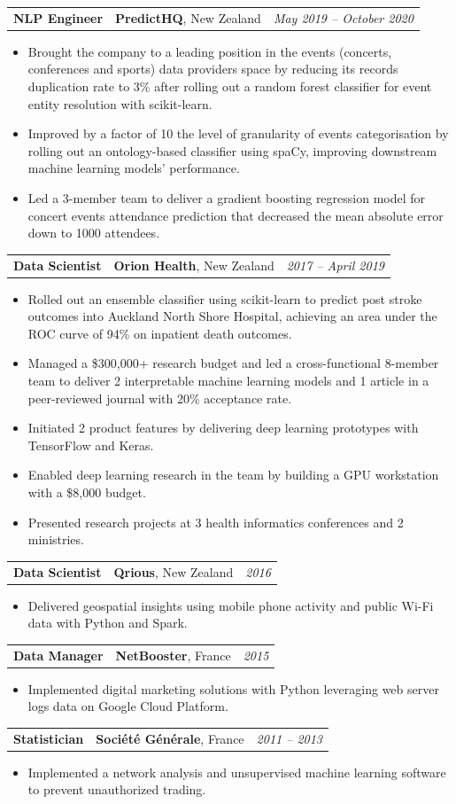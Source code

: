 \documentclass[letterpaper,11pt]{article}
\newcommand{\resumeItemListStart}{\begin{itemize}[label=$\circ$, topsep=0.1cm, parsep=0cm, partopsep=0cm, itemsep=0.1cm, leftmargin=0.4cm]}
\newcommand{\resumeItem}[1]{\item\small{#1}}
\newcommand{\resumeJustifiedItem}[1]{\item\begin{justify}\small{#1}\end{justify}}
\newcommand{\resumeItemListEnd}{\end{itemize}}
\newcommand{\job}[4]{
    \begin{tabular}{p{7cm}p{6cm}p{5cm}}
      \hspace{-0.7em} \textbf{#1} & \textbf{\small{#2}}\scriptsize{, #3} & \hfill \textit{\small{#4}}
    \end{tabular}
}
\begin{document}
\job {NLP Engineer}{PredictHQ}{New Zealand}{May 2019 -- October 2020}
\resumeItemListStart
\resumeJustifiedItem {Brought the company to a leading position in the events (concerts, conferences and sports) data providers space by reducing its records duplication rate to 3\% after rolling out a random forest classifier for event entity resolution with scikit-learn.}
\resumeJustifiedItem {Improved by a factor of 10 the level of granularity of events categorisation by rolling out an ontology-based classifier using spaCy, improving downstream machine learning models' performance.}
\resumeJustifiedItem {Led a 3-member team to deliver a gradient boosting regression model for concert events attendance prediction that decreased the mean absolute error down to 1000 attendees.}
\resumeItemListEnd \vspace{0.2cm}
	
\job {Data Scientist}{Orion Health}{New Zealand}{2017 -- April 2019}
\resumeItemListStart
\resumeJustifiedItem {Rolled out an ensemble classifier using scikit-learn to predict post stroke outcomes into Auckland North Shore Hospital, achieving an area under the ROC curve of 94\% on inpatient death outcomes.}
\resumeJustifiedItem {Managed a \$300,000+ research budget and led a cross-functional 8-member team to deliver 2 interpretable machine learning models and 1 article in a peer-reviewed journal with 20\% acceptance rate.}
\resumeItem {Initiated 2 product features by delivering deep learning prototypes with TensorFlow and Keras.}
\resumeItem {Enabled deep learning research in the team by building a GPU workstation with a \$8,000 budget.}
\resumeItem {Presented research projects at 3 health informatics conferences and 2 ministries.}
\resumeItemListEnd \vspace{0.2cm}

\job {Data Scientist}{Qrious}{New Zealand}{2016}
\resumeItemListStart
\resumeItem {Delivered geospatial insights using mobile phone activity and public Wi-Fi data with Python and Spark.}
\resumeItemListEnd \vspace{0.2cm}

\job {Data Manager}{NetBooster}{France}{2015}
\resumeItemListStart
\resumeItem {Implemented digital marketing solutions with Python leveraging web server logs data on Google Cloud Platform.}
\resumeItemListEnd \vspace{0.2cm}

\job {Statistician}{Société Générale}{France}{2011 -- 2013}
\resumeItemListStart
\resumeItem {Implemented a network analysis and unsupervised machine learning software to prevent unauthorized trading.}
\resumeItemListEnd 
\end{document}
